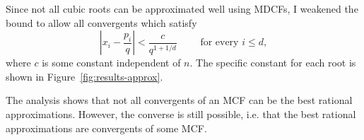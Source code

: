 Since not all cubic roots can be approximated well using MDCFs,
I weakened the bound to allow all convergents which satisfy
\begin{equation}
  \label{eq:sim-approx-weak}
  \left|x_i - \frac{p_i}{q}\right| < \frac{c}{q^{1 + 1/d}} \qquad \text{ for every } i ≤ d,
\end{equation}
where $c$ is some constant independent of $n$.
The specific constant for each root is shown in Figure~\ref{fig:results-approx}.





The analysis shows that not all convergents of an MCF can be the best rational
approximations.
However, the converse is still possible, i.e. that the best rational
approximations are convergents of some MCF.
